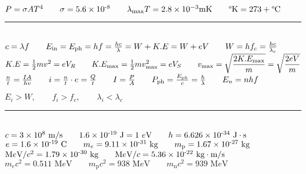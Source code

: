 \documentclass[a4paper,12pt]{article}
\newcommand{\sz}{\text{-}}
\begin{document}
\noindent
$P = \sigma AT^4 \qquad \sigma = 5.6 \times 10^{\sz8} \qquad \lambda_{\text{max}} T = 2.8 \times 10^{-3} \text{mK} \qquad \degree \text{K} = 273 + \degree \text{C}$

{\centering \rule{10cm}{0.4pt} \par}

\ \\
\noindent
$ c = \lambda f \qquad E_{\text{in}} = E_{\text{ph}} = hf = \frac{hc}{\lambda} = W + K.E = W + eV \qquad W = h f_c = \frac{hc}{\lambda_c} \\[+2mm]$
$ K.E = \frac{1}{2} mv^2 = eV_R \qquad K.E_{\text{max}} = \frac{1}{2} m v^2_{\text{max}} = eV_S \qquad v_{\text{max}} = \sqrt{\displaystyle \frac{2K.E_{\text{max}}}{m}} = \sqrt{\displaystyle \frac{2eV}{m}}\\[+2mm]$
$ \frac{n}{t} = \frac{IA}{hv} \qquad i = \frac{n}{t} \cdot e = \frac{Q}{t} \qquad I = \frac{P}{A} \qquad P_{\text{ph}} = \frac{E_\text{ph}}{c} = \frac{h}{\lambda} \qquad E_n = n hf \\$
\begin{center}
    $E_i > W, \qquad f_i > f_c, \qquad \lambda_i < \lambda_c$
\end{center}

{\centering \rule{10cm}{0.4pt} \par}

\ \\
\noindent
$c = 3 \times 10^8 \text{ m}/\text{s} \qquad 1.6\times 10^{\sz 19}\text{ J} = 1 \ e\text{V} \qquad h = 6.626 \times 10^{\sz34} \text{ J} \cdot \text{s}\\[+2mm]$
$e = 1.6 \times 10^{\sz 19} \text{ C} \qquad m_{e} = 9.11 \times 10^{\sz31} \text{ kg} \qquad m_{\text{p}} = 1.67 \times 10^{\sz27} \text{ kg}\\[+2mm]$
$\text{M}e\text{V}/c^2 = 1.79 \times 10^{\sz30} \text{ kg} \qquad \text{M}e\text{V}/c = 5.36 \times 10^{\sz22} \text{ kg}\cdot\text{m}/\text{s}\\[+2mm]$
$m_e c^2 = 0.511 \text{ M}e\text{V} \qquad m_\text{p}c^2 = 938 \text{ M}e\text{V} \qquad m_\text{n}c^2 = 939 \text{ M}e\text{V} $
\end{document}
